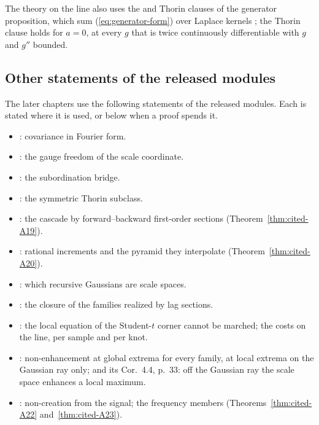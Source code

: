 The theory on the line also uses the \Matern{} and Thorin clauses of the generator proposition, which sum
(\ref{eq:generator-form}) over Laplace kernels ; the
Thorin clause holds for $a = 0$, at every $g$ that is twice continuously differentiable with $g$ and
$g''$ bounded.

\subsection{Other statements of the released modules}
\label{subsec:cited-released}

The later chapters use the following statements of the released modules. Each is stated where it
is used, or below when a proof spends it.
\begin{itemize}
\item {}: covariance in Fourier form.
\item {}: the gauge freedom of the scale coordinate.
\item {}: the subordination bridge.
\item {}: the symmetric Thorin subclass.
\item {}: the \Matern{} cascade by forward--backward
first-order sections (Theorem~\ref{thm:cited-A19}).
\item {}: rational increments and the pyramid they
interpolate (Theorem~\ref{thm:cited-A20}).
\item {}: which recursive Gaussians are scale spaces.
\item {}: the closure of the families realized by lag sections.
\item {}: the local equation of the Student-$t$
corner cannot be marched; the costs on the line, per sample and per knot.
\item {}: non-enhancement at global extrema for every family,
at local extrema on the Gaussian ray only; and its Cor.~4.4, p.~33: off the Gaussian ray the scale
space enhances a local maximum.
\item {}: non-creation from the signal; the \Polya{}
frequency members (Theorems~\ref{thm:cited-A22} and~\ref{thm:cited-A23}).

\end{itemize}
